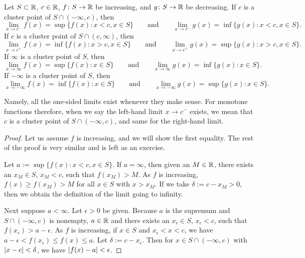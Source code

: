 \begin{prop} \label{prop:monotlimits}
Let $S \subset {\mathbb{R}}$, $c \in {\mathbb{R}}$,
$f \colon S \to {\mathbb{R}}$ be increasing,
and
$g \colon S \to {\mathbb{R}}$ be decreasing.
If $c$ is a cluster point of $S \cap (-\infty,c)$, then
\begin{equation*}
\lim_{x \to c^-} f(x) = \sup \{ f(x) : x < c, x \in S \}
\qquad \text{and} \qquad
\lim_{x \to c^-} g(x) = \inf \{ g(x) : x < c, x \in S \} .
\end{equation*}
If $c$ is a cluster point of $S \cap (c,\infty)$, then
\begin{equation*}
\lim_{x \to c^+} f(x) = \inf \{ f(x) : x > c, x \in S \}
\qquad \text{and} \qquad
\lim_{x \to c^+} g(x) = \sup \{ g(x) : x > c, x \in S \} .
\end{equation*}
If $\infty$ is a cluster point of $S$, then
\begin{equation*}
\lim_{x \to \infty} f(x) = \sup \{ f(x) : x \in S \}
\qquad \text{and} \qquad
\lim_{x \to \infty} g(x) = \inf \{ g(x) : x \in S \} .
\end{equation*}
If $-\infty$ is a cluster point of $S$, then
\begin{equation*}
\lim_{x \to -\infty} f(x) = \inf \{ f(x) : x \in S \}
\qquad \text{and} \qquad
\lim_{x \to -\infty} g(x) = \sup \{ g(x) : x \in S \} .
\end{equation*}
\end{prop}

Namely, all the one-sided limits exist whenever they make
sense.  For monotone functions therefore, when we say
the left-hand limit $x \to c^-$
exists, we mean that $c$ is a cluster point of $S \cap (-\infty,c)$,
and same for the right-hand limit.

\begin{proof}
Let us assume $f$ is increasing, and we will show the first
equality.  The rest of the proof is very similar and is left as an
exercise.

Let $a := \sup \{ f(x) : x < c, x \in S \}$.  If $a = \infty$,
then given an $M \in {\mathbb{R}}$, there exists an $x_M \in S$, $x_M < c$, such that $f(x_M) > M$. 
As $f$ is increasing, $f(x) \geq f(x_M) >  M$ for all $x \in S$ with $x > x_M$.  If
we take $\delta := c-x_M > 0$, then we obtain the definition of the limit going to
infinity.

Next suppose $a < \infty$.
Let $\epsilon > 0$ be given.  Because $a$ is the supremum and
$S \cap (-\infty,c)$ is nonempty, $a \in {\mathbb{R}}$ and
there exists an
$x_\epsilon \in S$,
$x_\epsilon < c$,
such that $f(x_\epsilon) > a-\epsilon$.  As $f$ is increasing,
if $x \in S$ and $x_\epsilon < x < c$, we have
$a-\epsilon < f(x_\epsilon) \leq f(x) \leq a$.  Let
$\delta := c-x_\epsilon$.  Then for $x \in S \cap (-\infty,c)$
with $\left\lvert {x-c} \right\rvert < \delta$,
we have $\left\lvert {f(x)-a} \right\rvert < \epsilon$.
\end{proof}

